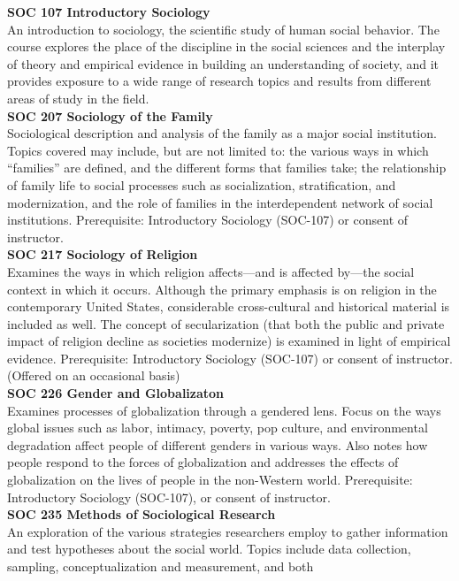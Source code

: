 \documentclass[
  letterpaper,
]{scrbook}
\begin{document}
\textbf{SOC 107 Introductory Sociology}\\
An introduction to sociology, the scientific study of human social
behavior. The course explores the place of the discipline in the social
sciences and the interplay of theory and empirical evidence in building
an understanding of society, and it provides exposure to a wide range of
research topics and results from different areas of study in the
field.\\
\textbf{SOC 207 Sociology of the Family}\\
Sociological description and analysis of the family as a major social
institution. Topics covered may include, but are not limited to: the
various ways in which ``families'' are defined, and the different forms
that families take; the relationship of family life to social processes
such as socialization, stratification, and modernization, and the role
of families in the interdependent network of social institutions.
Prerequisite: Introductory Sociology (SOC-107) or consent of
instructor.\\
\textbf{SOC 217 Sociology of Religion}\\
Examines the ways in which religion affects---and is affected by---the
social context in which it occurs. Although the primary emphasis is on
religion in the contemporary United States, considerable cross-cultural
and historical material is included as well. The concept of
secularization (that both the public and private impact of religion
decline as societies modernize) is examined in light of empirical
evidence. Prerequisite: Introductory Sociology (SOC-107) or consent of
instructor. (Offered on an occasional basis)\\
\textbf{SOC 226 Gender and Globalizaton}\\
Examines processes of globalization through a gendered lens. Focus on
the ways global issues such as labor, intimacy, poverty, pop culture,
and environmental degradation affect people of different genders in
various ways. Also notes how people respond to the forces of
globalization and addresses the effects of globalization on the lives of
people in the non-Western world. Prerequisite: Introductory Sociology
(SOC-107), or consent of instructor.\\
\textbf{SOC 235 Methods of Sociological Research}\\
An exploration of the various strategies researchers employ to gather
information and test hypotheses about the social world. Topics include
data collection, sampling, conceptualization and measurement, and both
\end{document}
